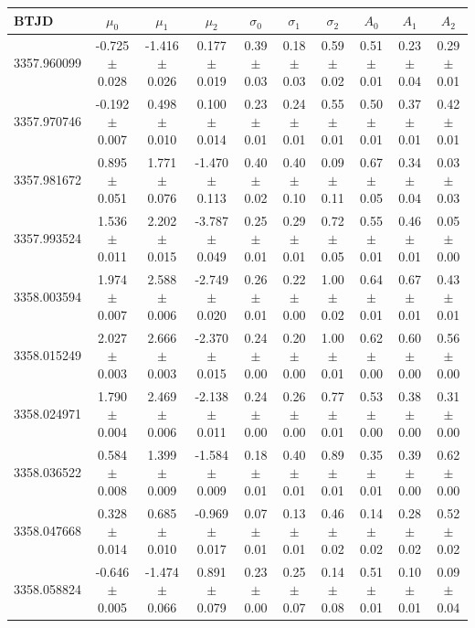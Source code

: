 \documentclass[11pt,twocolumn,tighten,linenumbers]{aastex7}
\begin{document}
\begin{table}
  \footnotesize
  \centering
  \begin{tabular}{lccccccccc}
  \hline
  BTJD & $\mu_0$ & $\mu_1$ & $\mu_2$ & $\sigma_0$ & $\sigma_1$ & $\sigma_2$ & $A_0$ & $A_1$ & $A_2$ \\
  \hline
  3357.960099 & -0.725 $\pm$ 0.028 & -1.416 $\pm$ 0.026 & 0.177 $\pm$ 0.019 & 0.39 $\pm$ 0.03 & 0.18 $\pm$ 0.03 & 0.59 $\pm$ 0.02 & 0.51 $\pm$ 0.01 & 0.23 $\pm$ 0.04 & 0.29 $\pm$ 0.01 \\
  3357.970746 & -0.192 $\pm$ 0.007 & 0.498 $\pm$ 0.010 & 0.100 $\pm$ 0.014 & 0.23 $\pm$ 0.01 & 0.24 $\pm$ 0.01 & 0.55 $\pm$ 0.01 & 0.50 $\pm$ 0.01 & 0.37 $\pm$ 0.01 & 0.42 $\pm$ 0.01 \\
  3357.981672 & 0.895 $\pm$ 0.051 & 1.771 $\pm$ 0.076 & -1.470 $\pm$ 0.113 & 0.40 $\pm$ 0.02 & 0.40 $\pm$ 0.10 & 0.09 $\pm$ 0.11 & 0.67 $\pm$ 0.05 & 0.34 $\pm$ 0.04 & 0.03 $\pm$ 0.03 \\
  3357.993524 & 1.536 $\pm$ 0.011 & 2.202 $\pm$ 0.015 & -3.787 $\pm$ 0.049 & 0.25 $\pm$ 0.01 & 0.29 $\pm$ 0.01 & 0.72 $\pm$ 0.05 & 0.55 $\pm$ 0.01 & 0.46 $\pm$ 0.01 & 0.05 $\pm$ 0.00 \\
  3358.003594 & 1.974 $\pm$ 0.007 & 2.588 $\pm$ 0.006 & -2.749 $\pm$ 0.020 & 0.26 $\pm$ 0.01 & 0.22 $\pm$ 0.00 & 1.00 $\pm$ 0.02 & 0.64 $\pm$ 0.01 & 0.67 $\pm$ 0.01 & 0.43 $\pm$ 0.01 \\
  3358.015249 & 2.027 $\pm$ 0.003 & 2.666 $\pm$ 0.003 & -2.370 $\pm$ 0.015 & 0.24 $\pm$ 0.00 & 0.20 $\pm$ 0.00 & 1.00 $\pm$ 0.01 & 0.62 $\pm$ 0.00 & 0.60 $\pm$ 0.00 & 0.56 $\pm$ 0.00 \\
  3358.024971 & 1.790 $\pm$ 0.004 & 2.469 $\pm$ 0.006 & -2.138 $\pm$ 0.011 & 0.24 $\pm$ 0.00 & 0.26 $\pm$ 0.00 & 0.77 $\pm$ 0.01 & 0.53 $\pm$ 0.00 & 0.38 $\pm$ 0.00 & 0.31 $\pm$ 0.00 \\
  3358.036522 & 0.584 $\pm$ 0.008 & 1.399 $\pm$ 0.009 & -1.584 $\pm$ 0.009 & 0.18 $\pm$ 0.01 & 0.40 $\pm$ 0.01 & 0.89 $\pm$ 0.01 & 0.35 $\pm$ 0.01 & 0.39 $\pm$ 0.00 & 0.62 $\pm$ 0.00 \\
  3358.047668 & 0.328 $\pm$ 0.014 & 0.685 $\pm$ 0.010 & -0.969 $\pm$ 0.017 & 0.07 $\pm$ 0.01 & 0.13 $\pm$ 0.01 & 0.46 $\pm$ 0.02 & 0.14 $\pm$ 0.02 & 0.28 $\pm$ 0.02 & 0.52 $\pm$ 0.02 \\
  3358.058824 & -0.646 $\pm$ 0.005 & -1.474 $\pm$ 0.066 & 0.891 $\pm$ 0.079 & 0.23 $\pm$ 0.00 & 0.25 $\pm$ 0.07 & 0.14 $\pm$ 0.08 & 0.51 $\pm$ 0.01 & 0.10 $\pm$ 0.01 & 0.09 $\pm$ 0.04 \\

\end{tabular}
\end{table}
\end{document}
